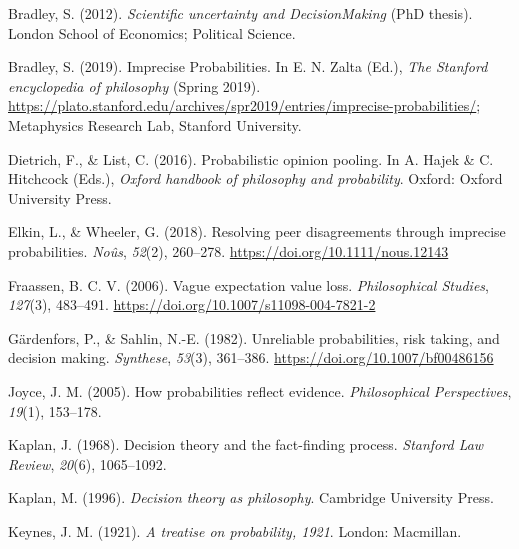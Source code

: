 \documentclass[
  10pt,
  dvipsnames,enabledeprecatedfontcommands]{scrartcl}
\newlength{\cslhangindent}
\newlength{\cslentryspacingunit} %
\newenvironment{CSLReferences}[2] %
 {%
  \setlength{\parindent}{0pt}
  \ifodd #1
  \let\oldpar\par
  \def\par{\hangindent=\cslhangindent\oldpar}
  \fi
  \setlength{\parskip}{#2\cslentryspacingunit}
 }%
 {}
\begin{document}
\hypertarget{refs}{}
\begin{CSLReferences}{1}{0}
\leavevmode{}%
Bradley, S. (2012). \emph{Scientific uncertainty and DecisionMaking}
(PhD thesis). London School of Economics; Political Science.

\leavevmode{}%
Bradley, S. (2019). {Imprecise Probabilities}. In E. N. Zalta (Ed.),
\emph{The {Stanford} encyclopedia of philosophy} ({S}pring 2019).
\url{https://plato.stanford.edu/archives/spr2019/entries/imprecise-probabilities/};
Metaphysics Research Lab, Stanford University.

\leavevmode{}%
Dietrich, F., \& List, C. (2016). Probabilistic opinion pooling. In A.
Hajek \& C. Hitchcock (Eds.), \emph{Oxford handbook of philosophy and
probability}. Oxford: Oxford University Press.

\leavevmode{}%
Elkin, L., \& Wheeler, G. (2018). Resolving peer disagreements through
imprecise probabilities. \emph{Noûs}, \emph{52}(2), 260--278.
\url{https://doi.org/10.1111/nous.12143}

\leavevmode{}%
Fraassen, B. C. V. (2006). Vague expectation value loss.
\emph{Philosophical Studies}, \emph{127}(3), 483--491.
\url{https://doi.org/10.1007/s11098-004-7821-2}

\leavevmode{}%
Gärdenfors, P., \& Sahlin, N.-E. (1982). Unreliable probabilities, risk
taking, and decision making. \emph{Synthese}, \emph{53}(3), 361--386.
\url{https://doi.org/10.1007/bf00486156}

\leavevmode{}%
Joyce, J. M. (2005). How probabilities reflect evidence.
\emph{Philosophical Perspectives}, \emph{19}(1), 153--178.

\leavevmode{}%
Kaplan, J. (1968). Decision theory and the fact-finding process.
\emph{Stanford Law Review}, \emph{20}(6), 1065--1092.

\leavevmode{}%
Kaplan, M. (1996). \emph{Decision theory as philosophy}. Cambridge
University Press.

\leavevmode{}%
Keynes, J. M. (1921). \emph{A treatise on probability, 1921}. London:
Macmillan.


\end{CSLReferences}
\end{document}
